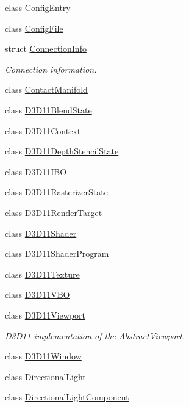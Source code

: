 \begin{DoxyCompactItemize}
class \hyperlink{class_blade_1_1_config_entry}{Config\+Entry}
\item 
class \hyperlink{class_blade_1_1_config_file}{Config\+File}
\item 
struct \hyperlink{struct_blade_1_1_connection_info}{Connection\+Info}
\begin{DoxyCompactList}\small\item\em Connection information. \end{DoxyCompactList}\item 
class \hyperlink{class_blade_1_1_contact_manifold}{Contact\+Manifold}
\item 
class \hyperlink{class_blade_1_1_d3_d11_blend_state}{D3\+D11\+Blend\+State}
\item 
class \hyperlink{class_blade_1_1_d3_d11_context}{D3\+D11\+Context}
\item 
class \hyperlink{class_blade_1_1_d3_d11_depth_stencil_state}{D3\+D11\+Depth\+Stencil\+State}
\item 
class \hyperlink{class_blade_1_1_d3_d11_i_b_o}{D3\+D11\+I\+BO}
\item 
class \hyperlink{class_blade_1_1_d3_d11_rasterizer_state}{D3\+D11\+Rasterizer\+State}
\item 
class \hyperlink{class_blade_1_1_d3_d11_render_target}{D3\+D11\+Render\+Target}
\item 
class \hyperlink{class_blade_1_1_d3_d11_shader}{D3\+D11\+Shader}
\item 
class \hyperlink{class_blade_1_1_d3_d11_shader_program}{D3\+D11\+Shader\+Program}
\item 
class \hyperlink{class_blade_1_1_d3_d11_texture}{D3\+D11\+Texture}
\item 
class \hyperlink{class_blade_1_1_d3_d11_v_b_o}{D3\+D11\+V\+BO}
\item 
class \hyperlink{class_blade_1_1_d3_d11_viewport}{D3\+D11\+Viewport}
\begin{DoxyCompactList}\small\item\em D3\+D11 implementation of the \hyperlink{class_blade_1_1_abstract_viewport}{Abstract\+Viewport}. \end{DoxyCompactList}\item 
class \hyperlink{class_blade_1_1_d3_d11_window}{D3\+D11\+Window}
\item 
class \hyperlink{class_blade_1_1_directional_light}{Directional\+Light}
\item 
class \hyperlink{class_blade_1_1_directional_light_component}{Directional\+Light\+Component}
\item 

\end{DoxyCompactItemize}
